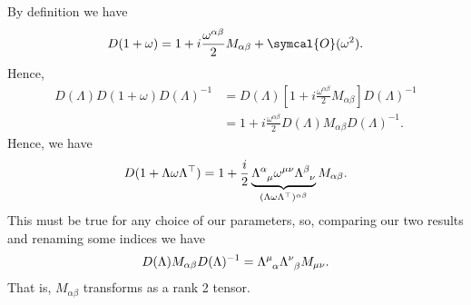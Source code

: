 \documentclass[fleqn]{NotesClass}
\newcommand{\trans}{\top}
\newcommand{\order}{\symcal{O}}
\begin{document}
    By definition we have
    \begin{equation}
        D(1 + \omega) = 1 + i\frac{\omega^{\alpha\beta}}{2}M_{\alpha\beta} + \order(\omega^2).
    \end{equation}
    Hence,
    \begin{align}
        D(\Lambda)D(1 + \omega)D(\Lambda)^{-1} &= D(\Lambda)\left[ 1 + i \frac{\omega^{\alpha\beta}}{2}M_{\alpha\beta} \right]D(\Lambda)^{-1}\\
        &= 1 + i\frac{\omega^{\alpha\beta}}{2}D(\Lambda)M_{\alpha\beta}D(\Lambda)^{-1}.
    \end{align}
    Hence, we have
    \begin{equation}
        D(1 + \Lambda\omega\Lambda^\trans) = 1 + \frac{i}{2}\underbrace{\tensor{\Lambda}{^\alpha_\mu}\omega^{\mu\nu}\tensor{\Lambda}{^\beta_\nu}}_{(\Lambda\omega\Lambda^\trans)^{\alpha\beta}}M_{\alpha\beta}.
    \end{equation}
    This must be true for any choice of our parameters, so, comparing our two results and renaming some indices we have
    \begin{equation}\label{eqn:deriving commutator in Lorentz algebra}
        D(\Lambda)M_{\alpha\beta}D(\Lambda)^{-1} = \tensor{\Lambda}{^\mu_\alpha}\tensor{\Lambda}{^\nu_\beta}M_{\mu\nu}.
    \end{equation}
    That is, \(M_{\alpha\beta}\) transforms as a rank 2 tensor.
    
\end{document}
